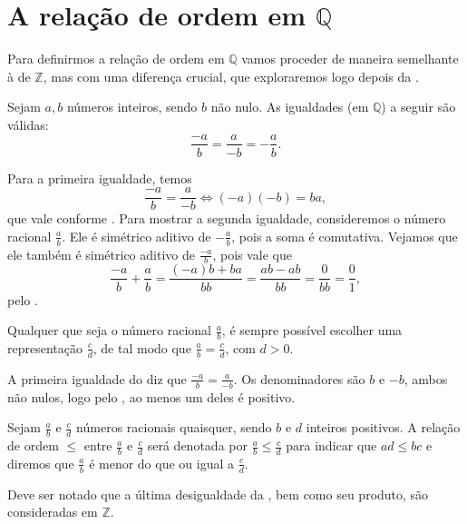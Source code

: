 \documentclass[../main.tex]{subfiles}
\begin{document}
\section{A relação de ordem em $\mathbb{Q}$}
Para definirmos a relação de ordem em $\mathbb{Q}$ vamos proceder de maneira semelhante à de $\mathbb{Z}$, mas com uma diferença crucial, que exploraremos logo depois da .
\begin{teo}\label{rac-teo-trocaSinaisNumeradorDenominador}
    Sejam $a,b$ números inteiros, sendo $b$ não nulo. As igualdades (em $\mathbb{Q}$) a seguir são válidas:
    \[ \frac{-a}{b} = \frac{a}{-b} = -\frac{a}{b}. \]
\end{teo}
\begin{dem}
    Para a primeira igualdade, temos 
    \[ \frac{-a}{b} = \frac{a}{-b} \iff (-a)(-b) = ba, \]
    que vale conforme .
    Para mostrar a segunda igualdade, consideremos o número racional $\frac{a}{b}$. Ele é simétrico aditivo de $-\frac{a}{b}$, pois a soma é comutativa. Vejamos que ele também é simétrico aditivo de $\frac{-a}{b}$, pois vale que 
    \[ \frac{-a}{b} + \frac{a}{b} = \frac{(-a)b + ba}{bb} = \frac{ab - ab}{bb} = \frac{0}{bb} = \frac{0}{1}, \] 
    pelo .
\end{dem}
\begin{corol}\label{rac-corol-escolhaDenominador}
    Qualquer que seja o número racional $\frac{a}{b}$, é sempre possível escolher uma representação $\frac{c}{d}$, de tal modo que $\frac{a}{b} = \frac{c}{d}$, com $d > 0$.
\end{corol}
\begin{dem}
    A primeira igualdade do  diz que $\frac{-a}{b} = \frac{a}{-b}$. Os denominadores são $b$ e $-b$, ambos não nulos, logo pelo , ao menos um deles é positivo.
\end{dem}

\begin{defi}\label{rac-def-relacaoOrdem}
    Sejam $\frac{a}{b}$ e $\frac{c}{d}$ números racionais quaisquer, sendo $b$ e $d$ inteiros positivos. A relação de ordem $\leq$ entre $\frac{a}{b}$ e $\frac{c}{d}$ será denotada por $\frac{a}{b} \leq \frac{c}{d}$ para indicar que $ad \leq bc$ e diremos que $\frac{a}{b}$ é menor do que ou igual a $\frac{c}{d}$. 
\end{defi}
\begin{obs}
    Deve ser notado que a última desigualdade da , bem como seu produto, são consideradas em $\mathbb{Z}$.
\end{obs}
\end{document}
